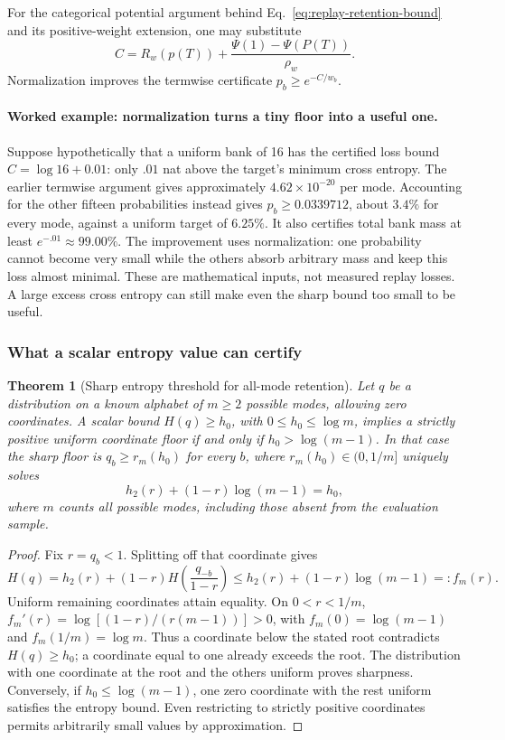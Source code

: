 \documentclass{article}
\newcommand{\1}{\mathbf 1}
\newtheorem{theorem}[lemma]{Theorem}
\theoremstyle{remark}
\theoremstyle{definition}
\theoremstyle{plain}
\begin{document}
For the categorical potential argument behind
Eq.~\eqref{eq:replay-retention-bound} and its positive-weight extension,
one may substitute
\[
 C=R_w(p(T))+
 \frac{\Psi(1)-\Psi(P(T))}{\rho_w}.
\]
Normalization improves the termwise certificate $p_b\ge e^{-C/w_b}$.

\paragraph{Worked example: normalization turns a tiny floor into a useful one.}
Suppose hypothetically that a uniform bank of 16 has the certified loss bound
$C=\log16+0.01$: only $.01$ nat above the target's minimum cross entropy.
The earlier termwise argument gives approximately $4.62\times10^{-20}$ per
mode. Accounting for the other fifteen probabilities instead gives
$p_b\ge0.0339712$, about $3.4\%$ for every mode, against a uniform target of
$6.25\%$. It also certifies total bank mass at least $e^{-.01}\approx99.00\%$.
The improvement uses normalization: one probability cannot become very small
while the others absorb arbitrary mass and keep this loss almost minimal.
These are mathematical inputs, not measured replay losses. A large excess
cross entropy can still make even the sharp bound too small to be useful.

\subsubsection{What a scalar entropy value can certify}

\begin{theorem}[Sharp entropy threshold for all-mode retention]
\label{ext:entropy-retention-threshold}
Let $q$ be a distribution on a known alphabet of $m\ge2$ possible modes,
allowing zero coordinates. A scalar bound $H(q)\ge h_0$, with
$0\le h_0\le\log m$, implies a strictly positive uniform coordinate floor
if and only if $h_0>\log(m-1)$. In that case the sharp floor is
$q_b\ge r_m(h_0)$ for every $b$, where $r_m(h_0)\in(0,1/m]$ uniquely solves
\[
 h_2(r)+(1-r)\log(m-1)=h_0,
\]
where $m$ counts all possible modes, including those absent from the
evaluation sample.
\end{theorem}
\begin{proof}
Fix $r=q_b<1$. Splitting off that coordinate gives
\[
 H(q)=h_2(r)+(1-r)H\!\left(\frac{q_{-b}}{1-r}\right)
 \le h_2(r)+(1-r)\log(m-1)=:f_m(r).
\]
Uniform remaining coordinates attain equality. On $0<r<1/m$,
$f_m'(r)=\log[(1-r)/(r(m-1))]>0$, with
$f_m(0)=\log(m-1)$ and $f_m(1/m)=\log m$. Thus a coordinate below the
stated root contradicts $H(q)\ge h_0$; a coordinate equal to one already
exceeds the root. The distribution with one coordinate at the root and the
others uniform proves sharpness. Conversely, if $h_0\le\log(m-1)$, one
zero coordinate with the rest uniform satisfies the entropy bound. Even
restricting to strictly positive coordinates permits arbitrarily small
values by approximation.
\end{proof}
\end{document}
